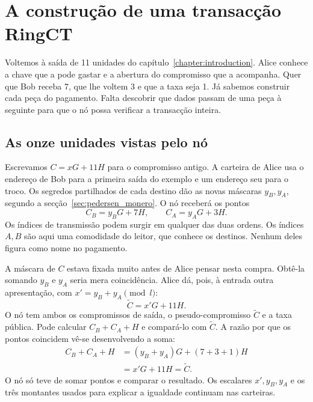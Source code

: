 \chapter{A construção de uma transacção RingCT}
\label{chapter:transactions}

%
Voltemos à saída de 11 unidades do capítulo~\ref{chapter:introduction}.
Alice conhece a chave que a pode gastar e a abertura do compromisso
que a acompanha. Quer que Bob receba 7, que lhe voltem 3 e que a taxa
seja 1. Já sabemos construir cada peça do pagamento. Falta descobrir
que dados passam de uma peça à seguinte para que o nó possa verificar
a transacção inteira.

\section{As onze unidades vistas pelo nó}
\label{sec:pagamento-ringct}

Escrevamos \(C=xG+11H\) para o compromisso antigo. A carteira de
Alice usa o endereço de Bob para a primeira saída do exemplo e um
endereço seu para o troco. Os segredos partilhados de cada destino
dão as novas máscaras \(y_B,y_A\), segundo a
secção~\ref{sec:pedersen_monero}. O nó receberá os pontos
\[
 C_B=y_BG+7H,\qquad C_A=y_AG+3H.
\]
Os índices de transmissão podem surgir em qualquer das duas ordens.
Os índices \(A,B\) são aqui uma comodidade do leitor, que conhece os
destinos. Nenhum deles figura como nome no pagamento.

A máscara de \(C\) estava fixada muito antes de Alice pensar nesta
compra. Obtê-la somando \(y_B\) e \(y_A\) seria mera coincidência.
Alice dá, pois, à entrada outra apresentação, com
\(x'=y_B+y_A\pmod l\):
\[
                       \widetilde C=x'G+11H .
\]
O nó tem ambos os compromissos de saída, o pseudo-compromisso
\(\widetilde C\) e a taxa pública. Pode calcular \(C_B+C_A+H\)
e compará-lo com \(\widetilde C\). A razão por que os pontos
coincidem vê-se desenvolvendo a soma:
\begin{align*}
 C_B+C_A+H
  &=(y_B+y_A)G+(7+3+1)H\\
  &=x'G+11H=\widetilde C .
\end{align*}
O nó só teve de somar pontos e comparar o resultado. Os escalares \(x',y_B,y_A\) e os três montantes usados
para explicar a igualdade continuam nas carteiras.

